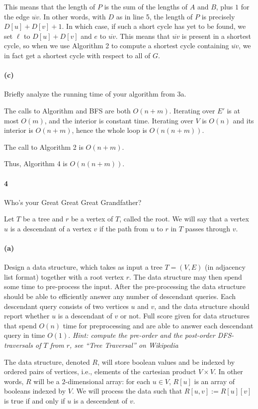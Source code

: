 \documentclass[12pt]{article}
\newlength{\myparskip}
\newenvironment{fullbox}{\begin{lrbox}{\savefullbox}\begin{minipage}{\dimexpr\textwidth-2\fboxsep\relax}\setlength{\parskip}{\myparskip}}{\end{minipage}\end{lrbox}\framebox[\textwidth]{\usebox{\savefullbox}}}
\newenvironment{pbox}[1][]{\begin{fullbox}\def\temp{#1}\ifx\temp\empty\else\paragraph{#1}\phantom{}\fi}{\end{fullbox}}
\theoremstyle{definition}
\newcommand{\<}{\langle}
\renewcommand{\>}{\rangle}
\begin{document}
This means that the length of $P$ is the sum of the lengths of $A$ and $B$, plus $1$ for the edge $\overline{uv}$.
In other words, with $D$ as in line 5, the length of $P$ is precisely $D[u] + D[v] + 1$.
In which case, if such a short cycle has yet to be found, we set $\ell$ to $D[u] + D[v]$ and $e$ to $\overline{uv}$.
This means that $\overline{uv}$ is present in a shortest cycle, so when we use Algorithm 2 to compute a shortest cycle containing $\overline{uv}$, we in fact get a shortest cycle with respect to all of $G$.


\begin{pbox}[(c)]
    Briefly analyze the running time of your algorithm from 3a.
\end{pbox}

The calls to Algorithm and BFS are both $O(n + m)$.
Iterating over $E'$ is at most $O(m)$, and the interior is constant time.
Iterating over $V$ is $O(n)$ and its interior is $O(n + m)$, hence the whole loop is $O(n(n + m))$.

The call to Algorithm 2 is $O(n + m)$.

Thus, Algorithm 4 is $O(n(n + m))$.


\newpage
\begin{pbox}[4]
    Who's your Great Great Great Grandfather?

    Let $T$ be a tree and $r$ be a vertex of $T$, called the root.
    We will say that a vertex $u$ is a descendant of a vertex $v$ if the path from $u$ to $r$ in $T$ passes through $v$.
\end{pbox}

\begin{pbox}[(a)]
    Design a data structure, which takes as input a tree $T = (V, E)$ (in adjacency list format) together with a root vertex $r$.
    The data structure may then spend some time to pre-process the input.
    After the pre-processing the data structure should be able to efficiently answer any number of descendant queries. Each descendant query consists of two vertices $u$ and $v$, and the data structure should report whether $u$ is a descendant of $v$ or not.
    Full score given for data structures that spend $O(n)$ time for preprocessing and are able to answer each descendant query in time $O(1)$.
    \textit{Hint: compute the pre-order and the post-order DFS-traversals of $T$ from $r$, see ``Tree Traversal'' on Wikipedia}
\end{pbox}

The data structure, denoted $R$, will store boolean values and be indexed by ordered pairs of vertices, i.e., elements of the cartesian product $V \times V$.
In other words, $R$ will be a $2$-dimensional array: for each $u \in V$, $R[u]$ is an array of booleans indexed by $V$.
We will process the data such that $R[u, v] := R[u][v]$ is true if and only if $u$ is a descendent of $v$.
\end{document}
